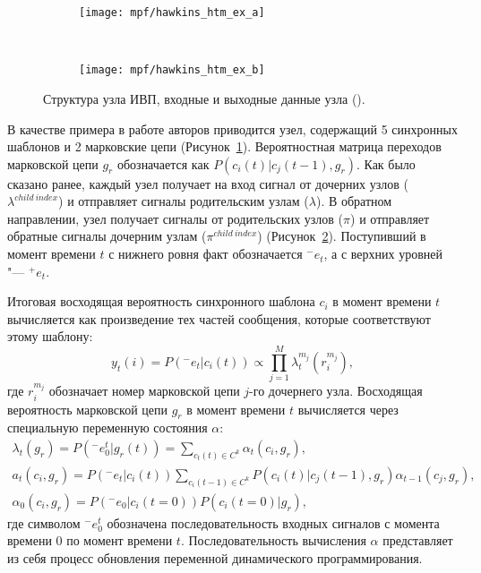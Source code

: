 \begin{figure}[h]
	\centering
	\begin{subfigure}[b]{0.45\textwidth}
		\texttt{[image: mpf/hawkins\_htm\_ex\_a]}
		\caption{}
		\label{fg:hawkins_htm_ex_a}
	\end{subfigure}
	~
	\begin{subfigure}[b]{0.45\textwidth}
		\texttt{[image: mpf/hawkins\_htm\_ex\_b]}
		\caption{}
		\label{fg:hawkins_htm_ex_b}
	\end{subfigure}
	\caption{Структура узла ИВП, входные и выходные данные узла (\cite{Hawkins2009}).}
	\label{fg:hawkins_htm_ex}
\end{figure}

В качестве примера в работе авторов приводится узел, содержащий 5 синхронных шаблонов и 2 марковские цепи (Рисунок~\ref{fg:hawkins_htm_ex_a}). Вероятностная матрица переходов марковской цепи $g_r$ обозначается как $P(c_i(t)|c_j(t-1),g_r)$. Как было сказано ранее, каждый узел получает на вход сигнал от дочерних узлов ($\lambda^{child\ index}$) и отправляет сигналы родительским узлам ($\lambda$). В обратном направлении, узел получает сигналы от родительских узлов ($\pi$) и отправляет обратные сигналы дочерним узлам ($\pi^{child\ index}$) (Рисунок~\ref{fg:hawkins_htm_ex_b}). Поступивший в момент времени $t$ с нижнего ровня факт обозначается ${}^-e_t$, а с верхних уровней "--- ${}^+e_t$.

Итоговая восходящая вероятность синхронного шаблона $c_i$ в момент времени $t$ вычисляется как произведение тех частей сообщения, которые соответствуют этому шаблону:
\begin{equation}
	y_t(i)=P({}^-e_t|c_i(t))\varpropto\prod_{j=1}^{M}\lambda_t^{m_j}(r_i^{m_j}),
\end{equation}
где $r_i^{m_j}$ обозначает номер марковской цепи $j$-го дочернего узла. Восходящая вероятность марковской цепи $g_r$ в момент времени $t$ вычисляется через специальную переменную состояния $\alpha$:
\begin{equation}
	\begin{split}
	\lambda_t(g_r)=P({}^-e_0^t|g_r(t)) = \sum_{c_t(t)\in C^k}\alpha_t(c_i, g_r),\\
	a_t(c_i,g_r )=P({}^-e_t|c_i(t))\sum_{c_i(t-1)\in C^k}P(c_i(t)|c_j(t-1),g_r)\alpha_{t-1}(c_j,g_r),\\
	\alpha_0(c_i,g_r)=P({}^-e_0|c_i(t=0))P(c_i(t=0)|g_r),
	\end{split}
\end{equation}
где символом ${}^-e_0^t$ обозначена последовательность входных сигналов с момента времени $0$ по момент времени $t$. Последовательность вычисления $\alpha$ представляет из себя процесс обновления переменной динамического программирования.

